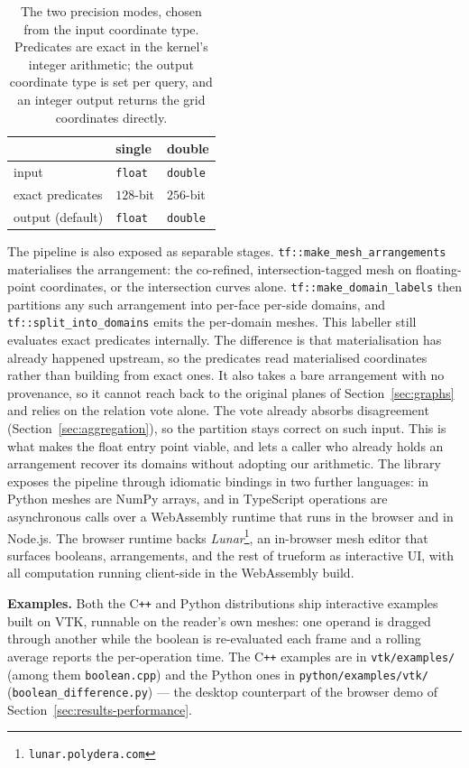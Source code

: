 \documentclass{egpubl}
\begin{document}
\begin{table}[t]
\centering
\caption{The two precision modes, chosen from the input coordinate type. Predicates are exact in the kernel's integer arithmetic; the output coordinate type is set per query, and an integer output returns the grid coordinates directly.}
\label{tab:precision}
\begin{tabular*}{\columnwidth}{@{\extracolsep{\fill}}lll@{}}
\toprule
 & single & double \\
\midrule
input            & \texttt{float} & \texttt{double} \\
exact predicates & $128$-bit      & $256$-bit \\
output (default) & \texttt{float} & \texttt{double} \\
\bottomrule
\end{tabular*}
\end{table}

The pipeline is also exposed as separable stages. \texttt{tf::make\_mesh\_arrangements} materialises the arrangement: the co-refined, intersection-tagged mesh on floating-point coordinates, or the intersection curves alone. \texttt{tf::make\_domain\_labels} then partitions any such arrangement into per-face per-side domains, and \texttt{tf::split\_into\_domains} emits the per-domain meshes. This labeller still evaluates exact predicates internally. The difference is that materialisation has already happened upstream, so the predicates read materialised coordinates rather than building from exact ones. It also takes a bare arrangement with no provenance, so it cannot reach back to the original planes of Section~\ref{sec:graphs} and relies on the relation vote alone. The vote already absorbs disagreement (Section~\ref{sec:aggregation}), so the partition stays correct on such input. This is what makes the float entry point viable, and lets a caller who already holds an arrangement recover its domains without adopting our arithmetic. The library exposes the pipeline through idiomatic bindings in two further languages: in Python meshes are NumPy arrays, and in TypeScript operations are asynchronous calls over a WebAssembly runtime that runs in the browser and in Node.js. The browser runtime backs \emph{Lunar}\footnote{\texttt{lunar.polydera.com}}, an in-browser mesh editor that surfaces booleans, arrangements, and the rest of trueform as interactive UI, with all computation running client-side in the WebAssembly build.

\textbf{Examples.} Both the C\texttt{++} and Python distributions ship interactive examples built on VTK, runnable on the reader's own meshes: one operand is dragged through another while the boolean is re-evaluated each frame and a rolling average reports the per-operation time. The C\texttt{++} examples are in \texttt{vtk/examples/} (among them \texttt{boolean.cpp}) and the Python ones in \texttt{python/examples/vtk/} (\texttt{boolean\_difference.py}) --- the desktop counterpart of the browser demo of Section~\ref{sec:results-performance}.
\end{document}
